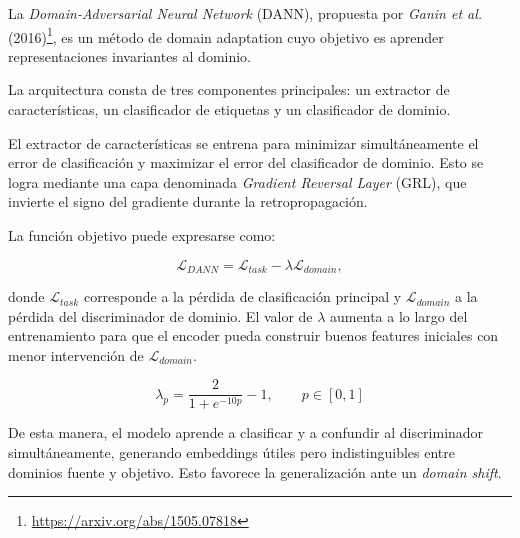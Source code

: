 La \textit{Domain-Adversarial Neural Network} (DANN), propuesta por \textit{Ganin et al.} (2016)\footnote{\url{https://arxiv.org/abs/1505.07818}}, es un método de domain adaptation cuyo objetivo es aprender representaciones invariantes al dominio.

La arquitectura consta de tres componentes principales: un extractor de características, un clasificador de etiquetas y un clasificador de dominio.

El extractor de características se entrena para minimizar simultáneamente el error de clasificación y maximizar el error del clasificador de dominio. Esto se logra mediante una capa denominada \textit{Gradient Reversal Layer} (GRL), que invierte el signo del gradiente durante la retropropagación.

La función objetivo puede expresarse como:

\begin{equation}
\mathcal{L}_{DANN} =
\mathcal{L}_{task} - \lambda \mathcal{L}_{domain},
\end{equation}

donde $\mathcal{L}_{task}$ corresponde a la pérdida de clasificación principal y $\mathcal{L}_{domain}$ a la pérdida del discriminador de dominio. El valor de $\lambda$ aumenta a lo largo del entrenamiento para que el encoder pueda construir buenos features iniciales con menor intervención de $\mathcal{L}_{domain}$.

\begin{equation}
    \lambda_p = \frac{2}{1 + e^{-10p}} - 1, \qquad p \in [0, 1]
\end{equation}

De esta manera, el modelo aprende a clasificar y a confundir al discriminador simultáneamente, generando embeddings útiles pero indistinguibles entre dominios fuente y objetivo. Esto favorece la generalización ante un \textit{domain shift}.